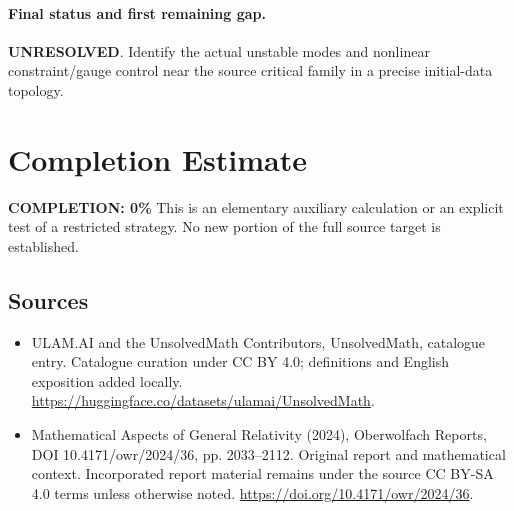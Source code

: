 \documentclass[11pt]{article}
\begin{document}
\paragraph{Final status and first remaining gap.}
\textbf{UNRESOLVED}. Identify the actual unstable modes and nonlinear constraint/gauge control near the source critical family in a precise initial-data topology.

\section{Completion Estimate}
\noindent\textbf{COMPLETION: 0\%}
This is an elementary auxiliary calculation or an explicit test of a restricted strategy. No new portion of the full source target is established.

\subsection{Sources}
\begin{itemize}
\item[\hypertarget{source:statement:1}{S1}] ULAM.AI and the UnsolvedMath Contributors, UnsolvedMath, catalogue entry. Catalogue curation under CC BY 4.0; definitions and English exposition added locally.
\url{https://huggingface.co/datasets/ulamai/UnsolvedMath}.
\item[\hypertarget{source:statement:2}{S2}] Mathematical Aspects of General Relativity (2024), Oberwolfach Reports, DOI 10.4171/owr/2024/36, pp. 2033--2112. Original report and mathematical context. Incorporated report material remains under the source CC BY-SA 4.0 terms unless otherwise noted.
\url{https://doi.org/10.4171/owr/2024/36}.
\end{itemize}
\label{end:statement}
\end{document}
